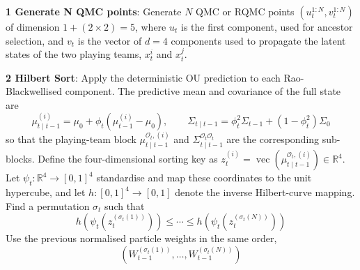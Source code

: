 



\textbf{1 Generate N QMC points}: Generate $N$ QMC or RQMC points $(u_t^{1:N}, v_t^{1:N})$ of dimension $1 + (2 \times 2) = 5$, where $u_t$ is the first component, used for ancestor selection, and $v_t$ is the vector of $d = 4$ components used to propagate the latent states of the two playing teams, $x_t^i$ and $x_t^j$.

\textbf{2 Hilbert Sort}: Apply the deterministic OU prediction to each Rao-Blackwellised component. The predictive mean and covariance of the full state are
\begin{equation}
    \mu_{t\mid t-1}^{(i)} = \mu_0 + \phi_t \left( \mu_{t-1}^{(i)} - \mu_0 \right), \qquad
    \Sigma_{t\mid t-1} = \phi_t^2 \Sigma_{t-1} + \left(1 - \phi_t^2\right) \Sigma_0 \nonumber
\end{equation}
so that the playing-team block $\mu_{t\mid t-1}^{\mathcal{O}_t,(i)}$ and $\Sigma_{t\mid t-1}^{\mathcal{O}_t\mathcal{O}_t}$ are the corresponding sub-blocks. Define the four-dimensional sorting key as $z_t^{(i)} = \operatorname{vec}\left( \mu_{t\mid t-1}^{\mathcal{O}_t,(i)} \right) \in \mathbb{R}^4$. Let $\psi_t:\mathbb{R}^4\rightarrow[0,1]^4$ standardise and map these coordinates to the unit hypercube, and let $h:[0,1]^4\rightarrow[0,1]$ denote the inverse Hilbert-curve mapping. Find a permutation $\sigma_t$ such that
\begin{equation}
    h\left(\psi_t(z_t^{(\sigma_t(1))})\right) \leq \cdots \leq h\left(\psi_t(z_t^{(\sigma_t(N))})\right) \nonumber
\end{equation}
Use the previous normalised particle weights in the same order,
\begin{equation}
    \left( W_{t-1}^{(\sigma_t(1))}, \ldots, W_{t-1}^{(\sigma_t(N))} \right) \nonumber
\end{equation}


